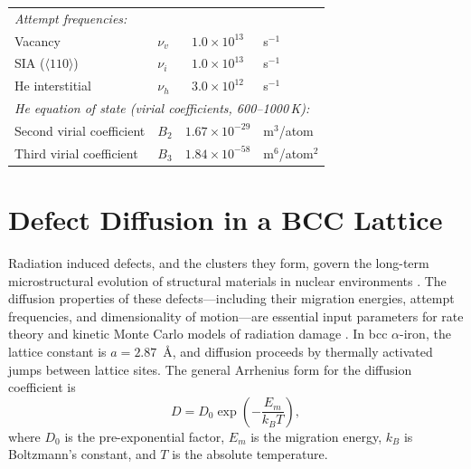 \documentclass[pdflatex,sn-basic]{sn-jnl} %
\begin{document}
\begin{table}[h!]
\begin{tabular}{@{}llcl@{}}
\multicolumn{4}{l}{\emph{Attempt frequencies:}} \\
Vacancy & $\nu_v$ & $1.0\times10^{13}$ & s$^{-1}$ \\
SIA ($\langle110\rangle$) & $\nu_i$ & $1.0\times10^{13}$ & s$^{-1}$ \\
He interstitial & $\nu_h$ & $3.0\times10^{12}$ & s$^{-1}$ \\[4pt]

\multicolumn{4}{l}{\emph{He equation of state (virial coefficients, 600--1000\,K):}} \\
Second virial coefficient & $B_2$ & $1.67\times10^{-29}$ & m$^3$/atom \\
Third virial coefficient & $B_3$ & $1.84\times10^{-58}$ & m$^6$/atom$^2$ \\
\bottomrule
\end{tabular}
\end{table}
\clearpage

\section{Defect Diffusion in a BCC Lattice}
\label{sec:framework}

Radiation induced defects, and the clusters they form, govern the long-term microstructural evolution of structural materials in nuclear environments \citep{Fu2005, Golubov2001}. The diffusion properties of these defects—including their migration energies, attempt frequencies, and dimensionality of motion—are essential input parameters for rate theory and kinetic Monte Carlo models of radiation damage \citep{Trinkaus2002, Heinisch2000}. In bcc $\alpha$-iron, the lattice constant is $a = 2.87$~\AA, and diffusion proceeds by thermally activated jumps between lattice sites. The general Arrhenius form for the diffusion coefficient is
\begin{equation}\label{eq:D_general}
    D = D_0 \exp\!\left(-\frac{E_m}{k_B T}\right),
\end{equation}
where $D_0$ is the pre-exponential factor, $E_m$ is the migration energy, $k_B$ is Boltzmann's constant, and $T$ is the absolute temperature.
\end{document}
